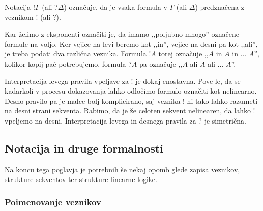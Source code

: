 \begin{definicija}
\begin{center}
\begin{bprooftree}
        \end{bprooftree}
        \begin{bprooftree}
        \end{bprooftree}
        \begin{bprooftree}
        \end{bprooftree}
        \begin{bprooftree}
        \end{bprooftree}
    \end{center}
    Notacija $!\Gamma$ (ali $?\Delta$) označuje, da je vsaka formula v $\Gamma$ (ali $\Delta$) predznačena z veznikom ! (ali ?).
\end{definicija}

Kar želimo z eksponenti označiti je, da imamo ,,poljubno mnogo'' označene formule na voljo. Ker vejice na levi beremo kot ,,in'', vejice na desni pa kot ,,ali'', je treba podati dva različna veznika. Formula $!A$ torej označuje ,,$A$ in $A$ in $\ldots$ $A$'', kolikor kopij pač potrebujemo, formula $?A$ pa označuje ,,$A$ ali $A$ ali $\ldots$ $A$''.

Interpretacija levega pravila vpeljave za ! je dokaj enostavna. Pove le, da se kadarkoli v procesu dokazovanja lahko odločimo formulo označiti kot nelinearno. Desno pravilo pa je malce bolj komplicirano, saj veznika ! ni tako lahko razumeti na desni strani sekventa. Rabimo, da je že celoten sekvent nelinearen, da lahko ! vpeljemo na desni. Interpretacija levega in desnega pravila za ? je simetrična.

\subsection{Notacija in druge formalnosti}

Na koncu tega poglavja je potrebnih še nekaj opomb glede zapisa veznikov, strukture sekventov ter strukture linearne logike.

\subsubsection{Poimenovanje veznikov}

